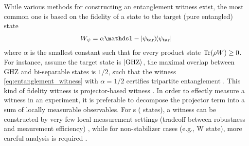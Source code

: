 \documentclass[
aps,
pra,
twocolumn,
floatfix,
]{revtex4-2}
\theoremstyle{plain}
\theoremstyle{definition}
\newtheorem{remark}{Remark}
\newcommand{\ew}{W}
\newcommand{\ob}{O}
\newcommand{\dm}{\rho}
\newcommand{\ghz}{\text{GHZ}}
\newcommand{\target}{\textup{tar}}
\newcommand{\prepare}{\textup{pre}}
\begin{document}
While various methods for constructing an entanglement witness exist, the most common one is based on the fidelity of a state to the target (pure entangled) state
\begin{equation}
	\ew_{\psi} = \alpha\identity - \op{\psi_\target} 
	\label{eq:entanglement_witness}
\end{equation}
where $\alpha$ is the smallest constant such that for every product state $\Tr(\dm\ew)\ge 0$.
For instance, assume the target state is $\ket{\ghz}$,
the maximal overlap between GHZ and bi-separable states is $1/2$,
such that the witness \cref{eq:entanglement_witness} with $\alpha=1/2$ certifies tripartite entanglement
\cite{acinClassificationMixedThreequbit2001}.
This kind of fidelity witness is projector-based witness \cite{bourennaneWitnessingMultipartiteEntanglement2004}.
In order to effectly measure a witness in an experiment, it is preferable to decompose the projector term into a sum of locally measurable observables. 
For s ( states),
a witness can be constructed by very few local measurement settings (tradeoff between robustness and meaurement efficiency) \cite{tothDetectingGenuineMultipartite2005} \cite{tothEntanglementDetectionStabilizer2005} \cite{zhouDetectingMultipartiteEntanglement2019},
while for non-stabilizer cases (e.g., W state), more careful analysis is required \cite{zhangEfficientEntanglementGeneration2021} \cite{zhuMachineLearningDerivedEntanglement2021}.
\end{document}
